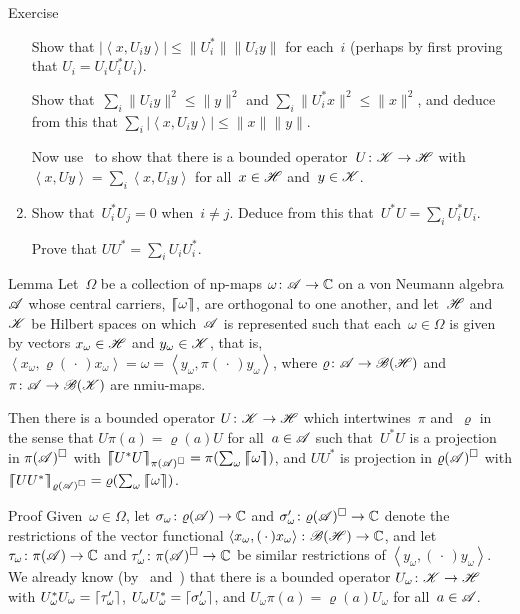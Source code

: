 \documentclass[a]{subfiles}
\begin{document}
\begin{parsec}
\begin{point}{Exercise}
\begin{point}
\begin{enumerate}
Show that
$\left|\left<x,U_iy\right>\right|
\leq \|U_i^*\| \|U_i y \|$
for each~$i$
(perhaps by first proving that  $U_i = U_i U_i^* U_i$).

Show that~$\sum_i \|U_i y\|^2 \leq \|y\|^2$
and $\sum_i \|U_i^* x\|^2\leq \|x\|^2$,
and deduce from this
that $\sum_i \left|\left<x,U_i y\right>\right| \leq \|x\|\|y\|$.

Now use~\TODO{}
to show that there is a bounded operator~$U\colon \mathscr{K}\to\mathscr{H}$
with $\left<x,Uy\right>
= \sum_i \left<x,U_iy\right>$
for all~$x\in\mathscr{H}$ and~$y\in \mathscr{K}$.
\item
Show that~$U_i^*U_j = 0$ when~$i\neq j$.
Deduce from this that~$U^*U = \sum_i U_i^* U_i$.

Prove that $UU^* = \sum_i U_iU_i^*$.
\end{enumerate}
\end{point}
\end{point}
\begin{point}{Lemma}%
Let~$\Omega$ be a collection of np-maps $\omega\colon \mathscr{A}\to\mathbb{C}$
on a von Neumann algebra~$\mathscr{A}$ 
whose central carriers,  $\left\lceil\!\!\left\lceil\omega\right\rceil\!\!\right\rceil$, are orthogonal to one another,
and let~$\mathscr{H}$ and~$\mathscr{K}$ be Hilbert spaces
on which~$\mathscr{A}$ is represented such
that each~$\omega\in\Omega$ 
is given by vectors $x_\omega\in\mathscr{H}$ and $y_\omega\in\mathscr{K}$,
that is,
$\left<x_\omega,\varrho(\,\cdot\,)x_\omega\right>
=\omega = \left<y_\omega,\pi(\,\cdot\,)y_\omega\right>$,
where $\varrho\colon \mathscr{A}\to\mathscr{B}(\mathscr{H})$
and $\pi\colon \mathscr{A}\to\mathscr{B}(\mathscr{K})$
are nmiu-maps.

Then there is a bounded operator $U\colon \mathscr{K}\to\mathscr{H}$
which intertwines~$\pi$ and~$\varrho$
in the sense that $U \pi(a)=\varrho(a) U$
for all~$a\in \mathscr{A}$
such that~$U^*U$
is a projection in
$\pi(\mathscr{A})^\square$
with
$\cceil{U^*U}_{\pi(\scrA)^\square}=\pi(\sum_\omega \cceil{\omega})$,
and 
$UU^*$
is projection in
$\varrho(\mathscr{A})^\square$
with
$\cceil{UU^*}_{\varrho(\scrA)^\square}=\varrho(\sum_\omega \cceil{\omega})$.
\begin{point}{Proof}%
Given~$\omega\in\Omega$,
let $\sigma_\omega\colon \varrho(\mathscr{A})\to \mathbb{C}$
and $\sigma_\omega'\colon \varrho(\mathscr{A})^\square\to\mathbb{C}$
denote the restrictions
of the vector functional $\left<x_\omega,(\,\cdot\,)x_\omega\right>
\colon \mathscr{B}(\mathscr{H})\to\mathbb{C}$,
and let  $\tau_\omega\colon \pi(\mathscr{A})\to \mathbb{C}$
and $\tau_\omega'\colon \pi(\mathscr{A})^\square\to\mathbb{C}$
be similar restrictions
of $\left<y_\omega,(\,\cdot\,)y_\omega\right>$.
We already know (by~
and~)
that
there is
a bounded operator $U_\omega\colon \mathscr{K}\to\mathscr{H}$
with $U_\omega^*U_\omega = \left\lceil\tau_\omega'\right\rceil$,
$U_\omega U_\omega^* = \left\lceil\sigma_\omega'\right\rceil$,
and $U_\omega \pi(a) = \varrho(a) U_\omega$
for all~$a\in\mathscr{A}$.


\end{point}
\end{point}
\end{parsec}
\end{document}
